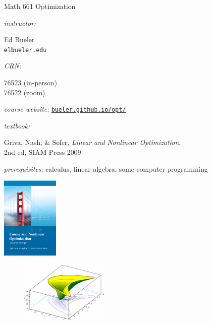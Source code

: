 \documentclass[12pt]{amsart}
\begin{document}
\begin{center}
\Huge Math 661 Optimization
\end{center}

\thispagestyle{empty}
\bigskip\bigskip

\noindent \emph{instructor:} \begin{minipage}[t]{0.5\textwidth} Ed Bueler \\ \texttt{elbueler\@@alaska.edu} \end{minipage} \hfill \emph{CRN:}\, \begin{minipage}[t]{0.2\textwidth} 76523 (in-person) \\ 76522 (zoom) \end{minipage}

\medskip
\noindent \emph{course website:} \href{https://bueler.github.io/opt/}{\texttt{bueler.github.io/opt/}}

\medskip
\noindent \emph{textbook:} \begin{minipage}[t]{0.7\textwidth} Griva, Nash, \& Sofer, \emph{Linear and Nonlinear Optimization}, \\ 2nd ed, SIAM Press 2009 \end{minipage}

\bigskip
\noindent \emph{prerequisites:} calculus, linear algebra, some computer programming

\vspace{-20mm}
\hfill \includegraphics[height=40mm]{../images/cover.jpg}

\vspace{5mm}

\begin{figure}
  \centering
    \includegraphics[width=0.38\textwidth]{../images/banana.png}
\end{figure}
\end{document}
